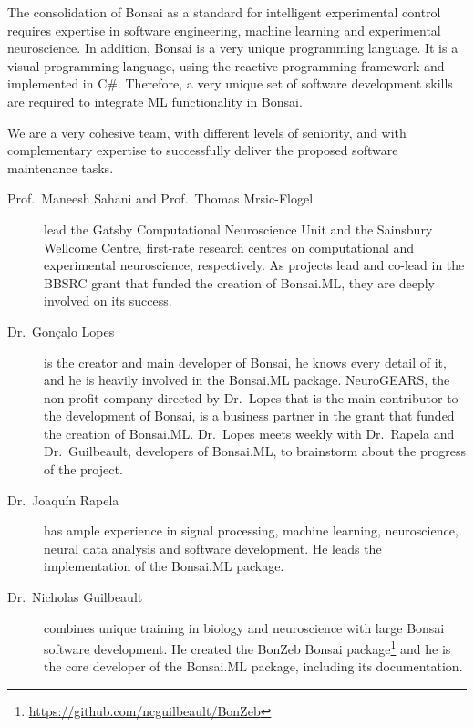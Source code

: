 The consolidation of Bonsai as a standard for intelligent experimental control
requires expertise in software engineering, machine learning and experimental
neuroscience.
%
In addition, Bonsai is a very unique programming language. It is a visual
programming language, using the reactive programming framework and implemented
in C\#.
%
Therefore, a very unique set of software development skills are required to
integrate ML functionality in Bonsai.

We are a very cohesive team, with different levels of seniority, and with
complementary expertise to successfully deliver the proposed software
maintenance tasks.

\begin{description}

    \item[Prof.~Maneesh Sahani and Prof.~Thomas Mrsic-Flogel] lead the Gatsby
        Computational Neuroscience Unit and the Sainsbury Wellcome Centre,
        first-rate research centres on computational and experimental
        neuroscience, respectively. As projects lead and co-lead in the BBSRC
        grant that funded the creation of Bonsai.ML, they are deeply involved
        on its success.

    \item[Dr.~Gonçalo Lopes] is the creator and main developer of Bonsai, he
        knows every detail of it, and he is heavily involved in the Bonsai.ML
        package.
        NeuroGEARS, the non-profit company directed by Dr.~Lopes that is the
        main contributor to the development of Bonsai, is a business partner in
        the grant that funded the creation of Bonsai.ML.
        Dr.~Lopes meets weekly with Dr.~Rapela and Dr.~Guilbeault, developers
        of Bonsai.ML, to brainstorm about the progress of the project.

    \item[Dr.~Joaquín Rapela] has ample experience in signal processing,
        machine learning, neuroscience, neural data analysis and software
        development. He leads the implementation of the Bonsai.ML package.

    \item[Dr.~Nicholas Guilbeault] combines unique training in biology and
        neuroscience with large Bonsai software development. He created the
        BonZeb Bonsai
        package\footnote[15]{\url{https://github.com/ncguilbeault/BonZeb}} and he
        is the core developer of the Bonsai.ML package, including its
        documentation.

\end{description}

